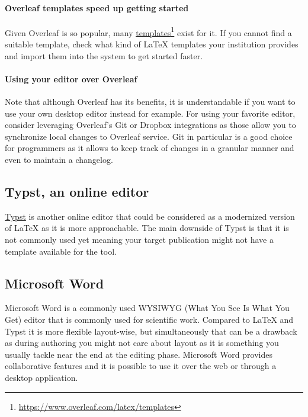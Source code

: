 \paragraph{Overleaf templates speed up getting started}

Given Overleaf is so popular, many \href{https://www.overleaf.com/latex/templates}{templates}\footnote{\url{https://www.overleaf.com/latex/templates}} exist for it.
If you cannot find a suitable template, check what kind of LaTeX templates your institution provides and import them into the system to get started faster. %

\paragraph{Using your editor over Overleaf}

Note that although Overleaf has its benefits, it is understandable if you want to use your own desktop editor instead for example.
For using your favorite editor, consider leveraging Overleaf's Git or Dropbox integrations as those allow you to synchronize local changes to Overleaf service. 
Git in particular is a good choice for programmers as it allows to keep track of changes in a granular manner and even to maintain a changelog.

\subsection{Typst, an online editor}

\href{https://typst.app/}{Typst} is another online editor that could be considered as a modernized version of LaTeX as it is more approachable.
The main downside of Typst is that it is not commonly used yet meaning your target publication might not have a template available for the tool.

\subsection{Microsoft Word}

Microsoft Word is a commonly used WYSIWYG (What You See Is What You Get) editor that is commonly used for scientific work.
Compared to LaTeX and Typst it is more flexible layout-wise, but simultaneously that can be a drawback as during authoring you might not care about layout as it is something you usually tackle near the end at the editing phase.
Microsoft Word provides collaborative features and it is possible to use it over the web or through a desktop application.

